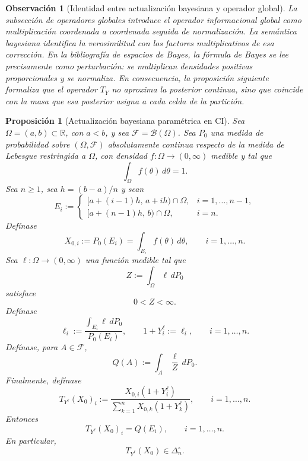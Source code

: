 \documentclass[12pt]{article}
\newtheorem{proposicion}{Proposición}[section]
\newtheorem{observacion}{Observación}[section]
\begin{document}
\begin{observacion}[Identidad entre actualización bayesiana y operador global]
La subsección de operadores globales introduce el operador informacional global como multiplicación coordenada a coordenada seguida de normalización. La semántica bayesiana identifica la verosimilitud con los factores multiplicativos de esa corrección. En la bibliografía de espacios de Bayes, la fórmula de Bayes se lee precisamente como perturbación: se multiplican densidades positivas proporcionales y se normaliza. En consecuencia, la proposición siguiente formaliza que el operador $T_Y$ no aproxima la posterior continua, sino que coincide con la masa que esa posterior asigna a cada celda de la partición.
\end{observacion}

\begin{proposicion}[Actualización bayesiana paramétrica en CI]\label{prop:bayes_parametrico}
Sea $\Omega=(a,b)\subset\mathbb R$, con $a<b$, y sea $\mathcal F=\mathcal B(\Omega)$. Sea $P_0$ una medida de probabilidad sobre $(\Omega,\mathcal F)$ absolutamente continua respecto de la medida de Lebesgue restringida a $\Omega$, con densidad $f:\Omega\to(0,\infty)$ medible y tal que
\[
\int_\Omega f(\theta)\,d\theta=1.
\]
Sea $n\ge 1$, sea $h=(b-a)/n$ y sean
\[
E_i:=
\begin{cases}
[a+(i-1)h,\,a+ih)\cap\Omega, & i=1,\dots,n-1,\\[4pt]
[a+(n-1)h,\,b)\cap\Omega, & i=n.
\end{cases}
\]
Defínase
\[
X_{0,i}:=P_0(E_i)=\int_{E_i}f(\theta)\,d\theta,
\qquad i=1,\dots,n.
\]
Sea $\ell:\Omega\to(0,\infty)$ una función medible tal que
\[
Z:=\int_\Omega\ell\,dP_0
\]
satisface
\[
0<Z<\infty.
\]
Defínase
\[
\ell_i:=\frac{\displaystyle\int_{E_i}\ell\,dP_0}{P_0(E_i)},
\qquad
1+Y_i^\ell:=\ell_i,
\qquad i=1,\dots,n.
\]
Defínase, para $A\in\mathcal F$,
\[
Q(A):=\int_A\frac{\ell}{Z}\,dP_0.
\]
Finalmente, defínase
\[
T_{Y^\ell}(X_0)_i
:=
\frac{X_{0,i}(1+Y_i^\ell)}{\displaystyle\sum_{k=1}^nX_{0,k}(1+Y_k^\ell)},
\qquad i=1,\dots,n.
\]
Entonces
\[
T_{Y^\ell}(X_0)_i=Q(E_i),
\qquad i=1,\dots,n.
\]
En particular,
\[
T_{Y^\ell}(X_0)\in\Delta_n^\circ.
\]
\end{proposicion}
\end{document}
